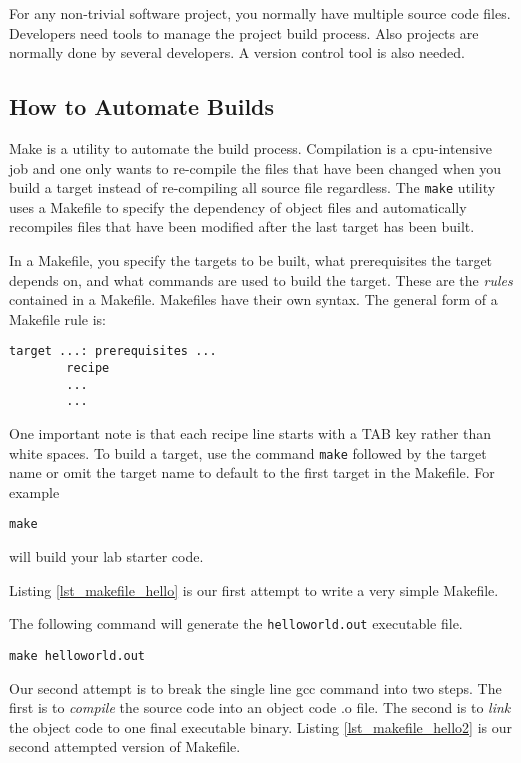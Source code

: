 For any non-trivial software project, you normally have multiple source code files. Developers need tools to manage the project build process. Also projects are normally done by several developers. A version control tool is also needed.

\subsection{How to Automate Builds}

Make is a utility to automate the build process. Compilation is a cpu-intensive job and one only wants to re-compile the files that have been changed when you build a target instead of re-compiling all source file regardless. 
The \verb+make+ utility uses a Makefile to specify the dependency of object files and automatically recompiles files that have been modified after the last target has been built. 

In a Makefile, you specify the targets to be built, what prerequisites the target depends on, and what commands are used to build the target. These are the {\em rules} contained in a Makefile. Makefiles have their own syntax.
The general form of a Makefile rule is:
\begin{lstlisting}[style=makefile]
target ...: prerequisites ... 
        recipe
        ...	
        ...	
\end{lstlisting}
One important note is that each recipe line starts with a TAB key rather than white spaces. To build a target, use the command \verb+make+ followed by the target name or omit the target name to default to the first target in the Makefile. For example
\begin{lstlisting}[style=bash]
make
\end{lstlisting}
will build your lab starter code.

Listing \ref{lst_makefile_hello} is our first attempt to write a very simple Makefile.


The following command will generate the \verb+helloworld.out+ executable file.
\begin{lstlisting}[style=bash]
make helloworld.out
\end{lstlisting}

Our second attempt is to break the single line gcc command into two steps. The first is to {\em compile} the source code into an object code .o file. The second is to {\em link} the object code to one final executable binary. 
Listing \ref{lst_makefile_hello2} is our second attempted  version of Makefile.

